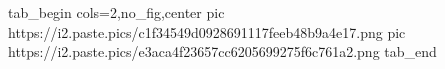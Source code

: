  
 
 
 
 
\qqSecCmtScr

\ifcmt
  tab_begin cols=2,no_fig,center
     pic https://i2.paste.pics/c1f34549d0928691117feeb48b9a4e17.png
		 pic https://i2.paste.pics/e3aca4f23657cc6205699275f6c761a2.png
  tab_end
\fi
